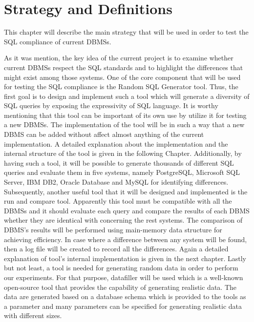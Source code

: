 \chapter{Strategy and Definitions}

This chapter will describe the main strategy that will be used in order to test the SQL compliance of current DBMSs. 
 
 As it was mention, the key idea of the current project is to examine whether current DBMSs respect the SQL standards and to highlight the differences that might exist among those systems. One of the core component that will be used  for testing the SQL compliance is the Random SQL Generator tool. Thus, the first goal is to design and implement such a tool which will generate a diversity of SQL queries by exposing the expressivity of SQL language. It is worthy mentioning that this tool can be important of its own use by utilize it for testing a new DBMSs. The implementation of the tool will be in such a way that a new DBMS can be added without affect almost anything of the current implementation. A detailed explanation about the implementation and the internal structure of the tool is given in the following Chapter. Additionally, by having such a tool, it will be possible to generate thousands of different SQL queries and evaluate them in five systems, namely PostgreSQL, Microsoft SQL Server, IBM DB2, Oracle Database and MySQL for identifying differences. 
Subsequently, another useful tool that it will be designed and implemented is the run and compare tool. Apparently this tool must be compatible with all the DBMSs and it should evaluate each query and compare the results of each DBMS whether they are identical with concerning the rest systems. The comparison of DBMS’s results will be performed using main-memory data structure for achieving efficiency. In case where a difference between any system will be found, then a log file will be created to record all the differences. Again a detailed explanation of tool’s internal implementation is given in the next chapter.
Lastly but not least, a tool is needed for generating random data in order to perform our experiments. For that purpose, datafiller will be used which is a well-known open-source tool that provides the capability of generating realistic data. The data are generated based on a database schema which is provided to the tools as a parameter and many parameters can be specified for generating realistic data with different sizes. 



 